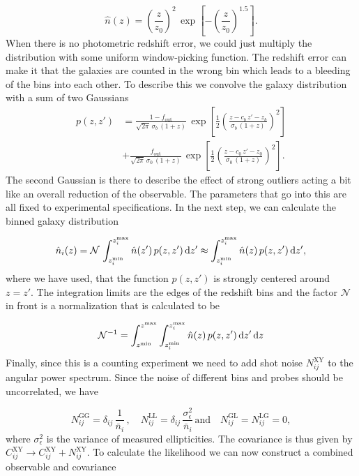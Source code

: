 \documentclass[../main.tex]{subfiles}
\begin{document}
 \begin{equation}
    \hat{n}(z) = \left(\frac{z}{z_0}\right)^2\,\exp\left[-\left(\frac{z}{z_0}\right)^{1.5}\right].
 \end{equation} 
 When there is no photometric redshift error, we could just multiply the distribution with some uniform window-picking function. The redshift error can make it that the galaxies are counted in the wrong bin which leads to a bleeding of the bins into each other. To describe this we convolve the galaxy distribution with a sum of two Gaussians
 \begin{align}
    p(z,z') &= \frac{1-f_\mathrm{out}}{\sqrt{2\pi}\,\sigma_b\,(1+z)}\,\exp\left[\frac{1}{2}\left(\frac{z-c_b\,z'-z_b}{\sigma_b\,(1+z)}\right)^2\right] \nonumber\\
    &+ \frac{f_\mathrm{out}}{\sqrt{2\pi}\,\sigma_0\,(1+z)}\,\exp\left[\frac{1}{2}\left(\frac{z-c_0\,z'-z_0}{\sigma_0\,(1+z)}\right)^2\right].
 \end{align}
 The second Gaussian is there to describe the effect of strong outliers acting a bit like an overall reduction of the observable. The parameters that go into this are all fixed to experimental specifications. In the next step, we can calculate the binned galaxy distribution 

 \begin{equation}
    \hat{n}_i(z) = \mathcal{N}\, \int_{z_i^\mathrm{min}}^{z_i^\mathrm{max}} \hat{n}(z')\, p(z,z')\,\mathrm{d} z' \approx \int_{z_i^\mathrm{min}}^{z_i^\mathrm{max}} \hat{n}(z)\, p(z,z')\,\mathrm{d} z' ,
 \end{equation}
 where we have used, that the function $p(z,z')$ is strongly centered around $z=z'$. The integration limits are the edges of the redshift bins and the factor $\mathcal{N}$ in front is a normalization that is calculated to be  
 
 \begin{equation}
    \mathcal{N}^{-1} = \int_{z^\mathrm{min}}^{z^\mathrm{max}} \int_{z_i^\mathrm{min}}^{z_i^\mathrm{max}} \hat{n}(z)\, p(z,z')\,\mathrm{d} z'\,\mathrm{d} z
 \end{equation}
 Finally, since this is a counting experiment we need to add shot noise $N^\mathrm{XY}_{ij}$ to the angular power spectrum. Since the noise of different bins and probes should be uncorrelated, we have

 \begin{equation}
    N^\mathrm{GG}_{ij} = \delta_{ij}\,\frac{1}{\bar{n}_i}\, ,\quad N^\mathrm{LL}_{ij} = \delta_{ij}\,\frac{\sigma^2_\epsilon}{\bar{n}_i}\,\text{and}\quad N^\mathrm{GL}_{ij} = N^\mathrm{LG}_{ij} = 0,
 \end{equation}
 where $\sigma^2_\epsilon$ is the variance of measured ellipticities. The covariance is thus given by $C^\mathrm{XY}_{ij} \to C^\mathrm{XY}_{ij}+N^\mathrm{XY}_{ij}$.
 To calculate the likelihood we can now construct a combined observable and covariance 
 
\end{document}
